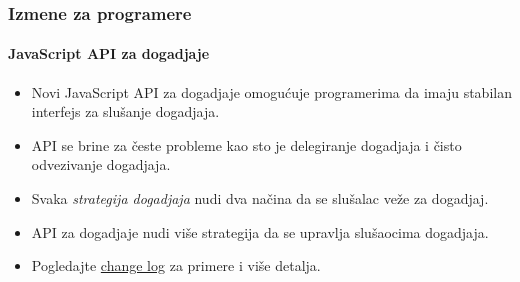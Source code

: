 
\begin{frame}[fragile]
	\frametitle{Izmene za programere}
	\framesubtitle{JavaScript API za dogadjaje}

	\begin{itemize}
		\item Novi JavaScript API za dogadjaje omogućuje programerima da imaju stabilan interfejs za slušanje dogadjaja.
		\item API se brine za česte probleme kao sto je delegiranje dogadjaja i čisto odvezivanje dogadjaja.
		\item Svaka \textit{strategija dogadjaja} nudi dva načina da se slušalac veže za dogadjaj.
		\item API za dogadjaje nudi više strategija da se upravlja slušaocima dogadjaja.
		\item Pogledajte
			\href{https://docs.typo3.org/c/typo3/cms-core/master/en-us/Changelog/10.3/Feature-90471-JavaScriptEventAPI.html}{change log}
			za primere i više detalja.
	\end{itemize}

\end{frame}

